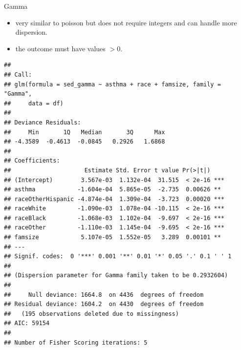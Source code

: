 \begin{frame}[fragile]{Gamma}

\begin{itemize}
\tightlist
\item
  very similar to poisson but does not require integers and can handle
  more dispersion.
\item
  the outcome must have values \(> 0\).
\end{itemize}

\small

\begin{Shaded}
\begin{Highlighting}[]
\OperatorTok{$}\StringTok{ }\OperatorTok{$}\OperatorTok{+}\StringTok{ }
\StringTok{ }\OperatorTok{~}\StringTok{ }\OperatorTok{+}\StringTok{ }\OperatorTok{+}\StringTok{ }
              \NormalTok{)}
\end{Highlighting}
\end{Shaded}

\begin{verbatim}
## 
## Call:
## glm(formula = sed_gamma ~ asthma + race + famsize, family = "Gamma", 
##     data = df)
## 
## Deviance Residuals: 
##     Min       1Q   Median       3Q      Max  
## -4.3589  -0.4613  -0.0845   0.2926   1.6868  
## 
## Coefficients:
##                     Estimate Std. Error t value Pr(>|t|)    
## (Intercept)        3.567e-03  1.132e-04  31.515  < 2e-16 ***
## asthma            -1.604e-04  5.865e-05  -2.735  0.00626 ** 
## raceOtherHispanic -4.874e-04  1.309e-04  -3.723  0.00020 ***
## raceWhite         -1.090e-03  1.078e-04 -10.115  < 2e-16 ***
## raceBlack         -1.068e-03  1.102e-04  -9.697  < 2e-16 ***
## raceOther         -1.110e-03  1.145e-04  -9.695  < 2e-16 ***
## famsize            5.107e-05  1.552e-05   3.289  0.00101 ** 
## ---
## Signif. codes:  0 '***' 0.001 '**' 0.01 '*' 0.05 '.' 0.1 ' ' 1
## 
## (Dispersion parameter for Gamma family taken to be 0.2932604)
## 
##     Null deviance: 1664.8  on 4436  degrees of freedom
## Residual deviance: 1604.2  on 4430  degrees of freedom
##   (195 observations deleted due to missingness)
## AIC: 59154
## 
## Number of Fisher Scoring iterations: 5
\end{verbatim}

\normalsize

\end{frame}

